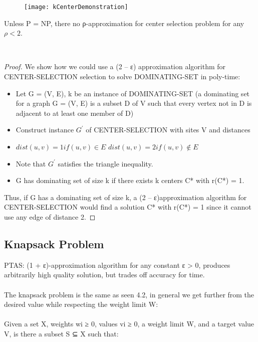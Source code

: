 \begin{figure}[H]
    \centering
    \texttt{[image: kCenterDemonstration]}
\end{figure}

\begin{claim}
    Unless P = NP, there no ρ-approximation for center selection problem for any $ρ < 2$.
\end{claim}\\

\begin{proof}
    We show how we could use a (2 – ε) approximation algorithm for CENTER-SELECTION selection to solve DOMINATING-SET in poly-time:
    \begin{itemize}
        \item{Let G = (V, E), k be an instance of DOMINATING-SET (a dominating set for a graph G = (V, E) is a subset D of V such that every vertex not in D is adjacent to at least one member of D)}
        \item{Construct instance $G^{'}$ of CENTER-SELECTION with sites V and distances}
        \item{$dist(u, v) = 1 if (u, v) \in E$ $dist(u, v) = 2 if (u, v) \notin E$}
        \item{Note that $G^{'}$ satisfies the triangle inequality.}
        \item{G has dominating set of size k if there exists k centers C* with r(C*) = 1.}
    \end{itemize}

    Thus, if G has a dominating set of size k, a (2 – ε)approximation algorithm for CENTER-SELECTION would find a solution C* with r(C*) = 1 since it cannot use any edge of distance 2.
\end{proof}

\subsection{Knapsack Problem}
PTAS: (1 + ε)-approximation algorithm for any constant ε > 0, produces arbitrarily high quality solution, but trades off accuracy for time.\\\\
The knapsack problem is the same as seen 4.2, in general we get further from the desired value while respecting the weight limit W:\\\\
Given a set X, weights wi ≥ 0, values vi ≥ 0, a weight limit W, and a target value V, is there a subset S ⊆ X such that:


